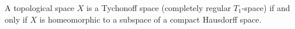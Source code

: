 A topological space $X$ is a Tychonoff space (completely regular $T_1$-space) if and only if $X$ is homeomorphic to a subspace of a compact Hausdorff space.
